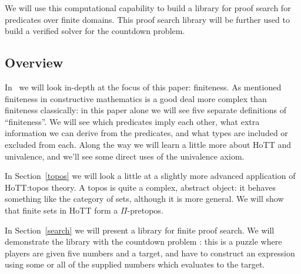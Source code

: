 We will use this computational capability to build a library for proof search
for predicates over finite domains.
This proof search library will be further used to build a verified solver for
the countdown problem.

\subsection{Overview}
In~ we will look in-depth at the focus of
this paper: finiteness.
As mentioned finiteness in constructive mathematics is a good deal more complex
than finiteness classically:
in this paper alone we will see five separate definitions of ``finiteness''.
We will see which predicates imply each other, what extra information we can
derive from the predicates, and what types are included or excluded from each.
Along the way we will learn a little more about HoTT and univalence, and we'll
see some direct uses of the univalence axiom.

In Section~\ref{topos} we will look a little at a slightly more advanced
application of HoTT:\@ topos theory.
A topos is quite a complex, abstract object: it behaves something like the
category of sets, although it is more general.
We will show that finite sets in HoTT form a $\Pi$-pretopos.

In Section~\ref{search} we will present a library for finite proof search.
We will demonstrate the library with the countdown problem
\cite{huttonCountdownProblem2002}: this is a puzzle where
players are given five numbers and a target, and have to construct an expression
using some or all of the supplied numbers which evaluates to the target.

